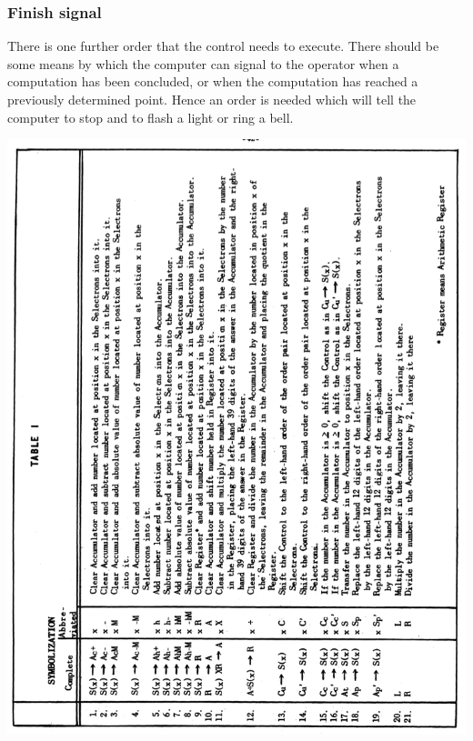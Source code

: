 \documentclass[12pt]{amsart}
\begin{document}
\subsubsection{Finish signal}
There is one further order that the control needs to execute. There should be some means by which the computer can signal to the operator when a computation has been concluded, or when the computation has reached a previously determined point. Hence an order is needed which will tell the computer to stop and to flash a light or ring a bell.
\raggedbottom

\includegraphics[width=160 mm]{Table-1}
\end{document}
